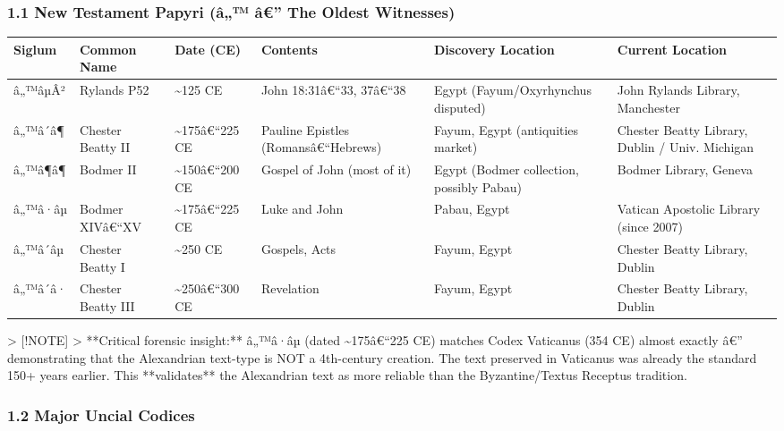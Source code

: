 \documentclass[aps,prd,11pt,onecolumn,superscriptaddress,nofootinbib,floatfix]{revtex4-2}
\begin{document}
\subsubsection{1.1 New Testament Papyri (â„™ â€'' The Oldest Witnesses)}


\begin{table}[h!]
\centering
\begin{tabular}{p{3cm}p{3cm}p{3cm}p{3cm}p{3cm}p{3cm}}
\hline
Siglum & Common Name & Date (CE) & Contents & Discovery Location & Current Location \\
\hline
â„™âµÂ² & Rylands P52 & \textasciitilde{}125 CE & John 18:31â€``33, 37â€``38 & Egypt (Fayum/Oxyrhynchus disputed) & John Rylands Library, Manchester \\
â„™â´â¶ & Chester Beatty II & \textasciitilde{}175â€``225 CE & Pauline Epistles (Romansâ€``Hebrews) & Fayum, Egypt (antiquities market) & Chester Beatty Library, Dublin / Univ. Michigan \\
â„™â¶â¶ & Bodmer II & \textasciitilde{}150â€``200 CE & Gospel of John (most of it) & Egypt (Bodmer collection, possibly Pabau) & Bodmer Library, Geneva \\
â„™â·âµ & Bodmer XIVâ€``XV & \textasciitilde{}175â€``225 CE & Luke and John & Pabau, Egypt & Vatican Apostolic Library (since 2007) \\
â„™â´âµ & Chester Beatty I & \textasciitilde{}250 CE & Gospels, Acts & Fayum, Egypt & Chester Beatty Library, Dublin \\
â„™â´â· & Chester Beatty III & \textasciitilde{}250â€``300 CE & Revelation & Fayum, Egypt & Chester Beatty Library, Dublin \\
\hline
\end{tabular}
\end{table}



> [!NOTE]
> **Critical forensic insight:** â„™â·âµ (dated \textasciitilde{}175â€``225 CE) matches Codex Vaticanus (354 CE) almost exactly â€'' demonstrating that the Alexandrian text-type is NOT a 4th-century creation. The text preserved in Vaticanus was already the standard 150+ years earlier. This **validates** the Alexandrian text as more reliable than the Byzantine/Textus Receptus tradition.


\subsubsection{1.2 Major Uncial Codices}
\end{document}
